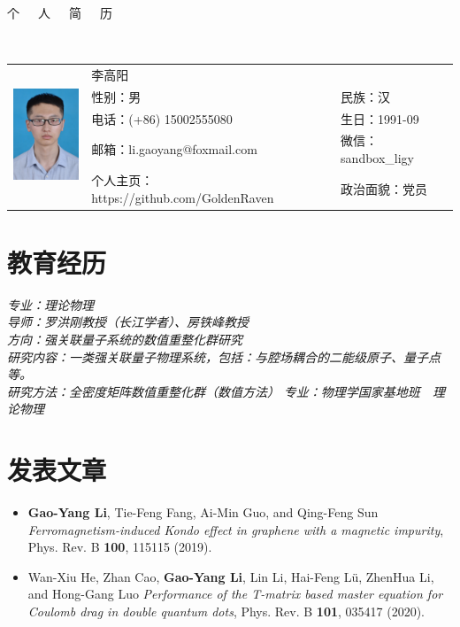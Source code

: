 \documentclass{resume}
\begin{document}

\begin{center}
\Huge{个~~~人~~~简~~~历}
\end{center}
\\
\Large{
  \begin{tabu}{ c l l }
    &
   \scshape{李高阳} &  \\
    & 性别：男 & 民族：汉 \\
    & 电话：(+86) 15002555080 & 生日：1991-09 \\
    & 邮箱：li.gaoyang@foxmail.com & 微信：sandbox\_ligy\\
    & 个人主页：https://github.com/GoldenRaven & 政治面貌：党员
  \end{tabu}
}

\section{教育经历}
\textit{专业：理论物理}\\
\textit{导师：罗洪刚教授（长江学者）、房铁峰教授}\\
\textit{方向：强关联量子系统的数值重整化群研究}\\
\textit{研究内容：一类强关联量子物理系统，包括：与腔场耦合的二能级原子、量子点等。}\\
\textit{研究方法：全密度矩阵数值重整化群（数值方法）}
\textit{专业：物理学国家基地班\ \ 理论物理}

\section{发表文章}
\begin{itemize}
\item \textbf{Gao-Yang Li}, Tie-Feng Fang, Ai-Min Guo, and Qing-Feng Sun \textit{Ferromagnetism-induced Kondo effect in graphene with a magnetic impurity}, Phys. Rev. B \textbf{100}, 115115 (2019).
\item Wan-Xiu He, Zhan Cao, \textbf{Gao-Yang Li}, Lin Li, Hai-Feng Lü, ZhenHua Li, and Hong-Gang Luo \textit{Performance of the T-matrix based master equation for Coulomb drag in double quantum dots}, Phys. Rev. B \textbf{101}, 035417 (2020).
\end{itemize}
\end{document}
